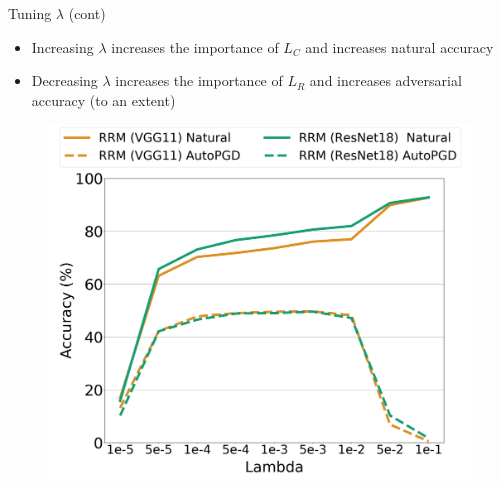 \documentclass{beamer}
\begin{document}

\begin{frame}{Tuning $\lambda$ (cont)}
	
	\begin{itemize}
		\item Increasing $\lambda$ increases the importance of $L_C$ and increases natural accuracy
		\item Decreasing $\lambda$ increases the importance of $L_R$ and increases adversarial accuracy (to an extent)
	\end{itemize}

	\begin{figure}
		\centering
		\includegraphics[scale=.3]{./images/tuning_lambda.png}
		\caption{}
	\end{figure}
	
\end{frame}

\end{document}
